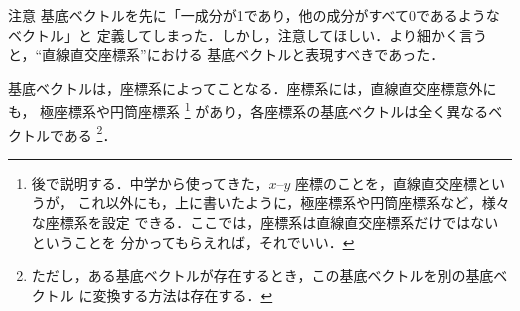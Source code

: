                     \begin{memo}{注意}
                        基底ベクトルを先に「一成分が1であり，他の成分がすべて0であるようなベクトル」と
                        定義してしまった．しかし，注意してほしい．より細かく言うと，“直線直交座標系”における
                        基底ベクトルと表現すべきであった．

                        基底ベクトルは，座標系によってことなる．座標系には，直線直交座標意外にも，
                        極座標系や円筒座標系
                            \footnote{
                                後で説明する．中学から使ってきた，$x$--$y$ 座標のことを，直線直交座標というが，
                                これ以外にも，上に書いたように，極座標系や円筒座標系など，様々な座標系を設定
                                できる．ここでは，座標系は直線直交座標系だけではないということを
                                分かってもらえれば，それでいい．
                            }
                        があり，各座標系の基底ベクトルは全く異なるベクトルである
                            \footnote{
                                ただし，ある基底ベクトルが存在するとき，この基底ベクトルを別の基底ベクトル
                                に変換する方法は存在する．
                            }．
                    \end{memo}
